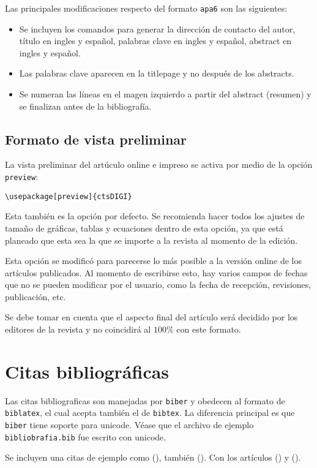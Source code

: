 \documentclass[preview]{ctsDIGI}
\begin{document}
Las principales modificaciones respecto del formato \texttt{apa6} son las siguientes:
\begin{itemize}
\item Se incluyen los comandos para generar la dirección de contacto del autor, título en ingles y español, palabras clave en ingles y español, abstract en ingles y español.
\item Las palabras clave aparecen en la titlepage y no después de los abstracts.
\item Se numeran las líneas en el magen izquierdo a partir del abstract (resumen) y se finalizan antes de la bibliografía.
\end{itemize}


\subsection{Formato de vista preliminar}
La vista preliminar del artúculo online e impreso se activa por medio de la opción \texttt{preview}:
\begin{verbatim}
\usepackage[preview]{ctsDIGI}
\end{verbatim}

Esta también es la opción por defecto. Se recomienda hacer todos los ajustes de tamaño de gráficas, tablas y ecuaciones dentro de esta opción, ya que está planeado que esta sea la que se importe a la revista al momento de la edición.

Esta opción se modificó para parecerse lo más posible a la versión online de los artículos publicados. Al momento de escribirse esto, hay varios campos de fechas que no se pueden modificar por el usuario, como la fecha de recepción, revisiones, publicación, etc.

Se debe tomar en cuenta que el aspecto final del artículo será decidido por los editores de la revista y no coincidirá al $100\%$ con este formato.

\section{Citas bibliográficas}
Las citas bibliograficas son manejadas por \texttt{biber} y obedecen al formato de \texttt{biblatex}, el cual acepta también el de \texttt{bibtex}. La diferencia principal es que \texttt{biber} tiene soporte para unicode. Véase que el archivo de ejemplo \texttt{bibliobrafia.bib} fue escrito con unicode. 

Se incluyen una citas de ejemplo como (\cite{halliday1986fundamentos}), también (\cite{knoll2010radiation}). Con los artículos (\cite{Maldacena:2016upp}) y (\cite{Aparicio:2016qqb}).
\end{document}
